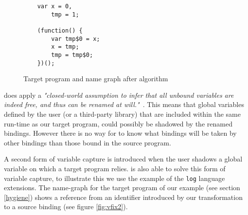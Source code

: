 \begin{figure}[h]
\centering
\begin{minipage}{0.25\linewidth}
\begin{lstlisting}
	var x = 0,
		tmp = 1;

	(function() {
		var tmp$0 = x;
		x = tmp;
		tmp = tmp$0;
	})();
\end{lstlisting}
\end{minipage}
\hfill
\begin{minipage}{0.65\linewidth}
\end{minipage}

\caption{Target program and name graph after \textit{\vfix} algorithm} \label{fig:name-graph-fixed}
\end{figure}

\textit{\vfix} does apply a \textit{"closed-world assumption to infer that all unbound variables are indeed free, and thus can be renamed at will."}~\cite{Erdweg2014}. This means that global variables defined by the user (or a third-party library) that are included within the same run-time as our target program, could possibly be shadowed by the renamed bindings. However there is no way for \textit{\vfix} to know what bindings will be taken by other bindings than those bound in the source program.

A second form of variable capture is introduced when the user shadows a global variable on which a target program relies. \textit{\vfix} is also able to solve this form of variable capture, to illustrate this we use the example of the \lstinline$log$ language extensions. The name-graph for the target program of our example (see section \ref{hygiene}) shows a reference from an identifier introduced by our transformation to a source binding (see figure \ref{fig:vfix2}).

